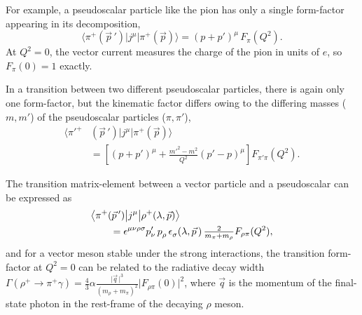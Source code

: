\documentclass[twocolumn,amsmath,amssymb,prd,10pt,floatfix, 
superscriptaddress,nofootinbib, showpacs, preprintnumbers]{revtex4-1}
\begin{document}
For example, a pseudoscalar particle like the pion has only a single form-factor appearing in its decomposition,
\begin{equation}
\big\langle \pi^+(\vec{p}\,') \big| j^\mu \big| \pi^+(\vec{p}) \big\rangle = (p+p')^\mu \, F_\pi(Q^2).
\label{pion_ff}
\end{equation} 
At $Q^2=0$, the vector current measures the charge of the pion in units of $e$, so $F_\pi(0) = 1$ exactly. 

In a transition between two different pseudoscalar particles, there is again only one form-factor, but the kinematic factor differs owing to the differing masses ($m, m'$) of the pseudoscalar particles ($\pi, \pi'$),
\begin{align}
\big\langle \pi'^+ & (\vec{p}\,') \big| j^\mu \big| \pi^+(\vec{p}) \big\rangle \nonumber \\
&= \left[ (p\!+\!p')^\mu \!+\! \tfrac{m'^2 - m^2}{Q^2} (p' \!-\! p)^\mu \right]\!  F_{\pi'\pi}(Q^2). \label{pi_pi_ff}
\end{align} 

The transition matrix-element between a vector particle and a pseudoscalar can be expressed as
\begin{align}
&\big\langle \pi^+(\vec{p}\,') \big| j^\mu \big| \rho^+(\lambda, \vec{p}) \big\rangle  \notag \\
&\qquad= \epsilon^{\mu \nu \rho \sigma} p'_\nu\, p^{\,}_\rho \,\epsilon^{\,}_\sigma(\lambda, \vec{p}\,) \, \tfrac{2}{m_\pi + m_\rho} F_{\rho \pi}(Q^2),
\label{rho_pi_ff}
\end{align} 
and for a vector meson stable under the strong interactions, the transition form-factor at ${Q^2=0}$ can be related to the radiative decay width ${\Gamma( \rho^+ \to \pi^+ \gamma) = \frac{4}{3} \alpha \frac{\lvert \vec{q}\,  \rvert^3}{(m_\rho + m_\pi)^2} \lvert F_{\rho \pi}(0) \rvert^2    }$, where $\vec{q}$ is the momentum of the final-state photon in the rest-frame of the decaying $\rho$ meson.
\end{document}
